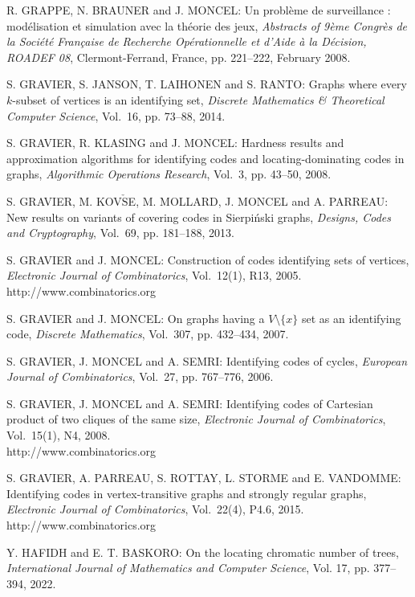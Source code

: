 \begin{thebibliography}{999}
R. GRAPPE, N. BRAUNER and J. MONCEL: Un probl\`eme de surveillance : mod\'elisation et simulation avec la th\'eorie des jeux, {\it Abstracts of 9\`eme Congr\`es de la Soci\'et\'e Fran\c{c}aise de Recherche Op\'erationnelle et d'Aide \`a la D\'ecision, ROADEF 08}, Clermont-Ferrand, France, pp. 221--222, February 2008.

S. GRAVIER, S. JANSON, T. LAIHONEN and S. RANTO: Graphs where every $k$-subset of vertices is an identifying set, {\it Discrete Mathematics \& Theoretical Computer Science}, Vol.~16, pp. 73--88, 2014.

S. GRAVIER, R. KLASING and J. MONCEL: Hardness results and approximation algorithms for identifying codes and locating-dominating codes in graphs, {\it Algorithmic Operations Research}, Vol.~3, pp. 43--50, 2008.

S. GRAVIER, M. KOV$\check{\textrm{S}}$E, M. MOLLARD, J. MONCEL and A. PARREAU: New results on variants of covering codes in Sierpi\'nski graphs, {\it Designs, Codes and Cryptography}, Vol.~69, pp. 181--188, 2013.

S. GRAVIER and J. MONCEL: Construction of codes identifying sets of vertices, {\it Electronic Journal of Combinatorics}, Vol.~12(1), R13, 2005.\\
http://www.combinatorics.org

S. GRAVIER and J. MONCEL: On graphs having a $V \setminus \{ x \}$ set as an identifying code, {\it Discrete Mathematics}, Vol.~307, pp. 432--434, 2007.

S. GRAVIER, J. MONCEL and A. SEMRI: Identifying codes of cycles, {\it European Journal of Combinatorics}, Vol.~27, pp. 767--776, 2006.

S. GRAVIER, J. MONCEL and A. SEMRI: Identifying codes of Cartesian product of two cliques of the same size, {\it Electronic Journal of Combinatorics}, Vol.~15(1), N4, 2008.\\
http://www.combinatorics.org

S. GRAVIER, A. PARREAU, S. ROTTAY, L. STORME and E. VANDOMME: Identifying codes in vertex-transitive graphs and strongly regular graphs, {\it Electronic Journal of Combinatorics}, Vol.~22(4), P4.6, 2015.\\
http://www.combinatorics.org

Y. HAFIDH and E. T. BASKORO: On the locating chromatic number of trees, {\it International Journal of Mathematics and Computer Science}, Vol. 17, pp. 377--394, 2022.


\end{thebibliography}
